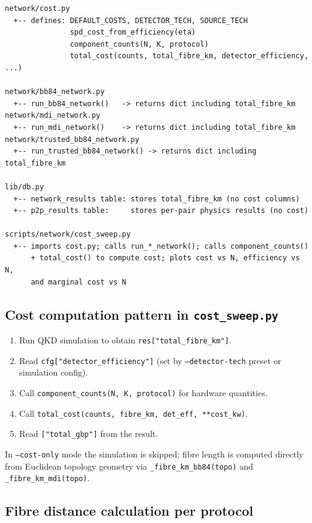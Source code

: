 \documentclass[12pt,a4paper]{article}
\begin{document}
\begin{verbatim}
network/cost.py
  +-- defines: DEFAULT_COSTS, DETECTOR_TECH, SOURCE_TECH
               spd_cost_from_efficiency(eta)
               component_counts(N, K, protocol)
               total_cost(counts, total_fibre_km, detector_efficiency, ...)

network/bb84_network.py
  +-- run_bb84_network()   -> returns dict including total_fibre_km
network/mdi_network.py
  +-- run_mdi_network()    -> returns dict including total_fibre_km
network/trusted_bb84_network.py
  +-- run_trusted_bb84_network() -> returns dict including total_fibre_km

lib/db.py
  +-- network_results table: stores total_fibre_km (no cost columns)
  +-- p2p_results table:     stores per-pair physics results (no cost)

scripts/network/cost_sweep.py
  +-- imports cost.py; calls run_*_network(); calls component_counts()
      + total_cost() to compute cost; plots cost vs N, efficiency vs N,
      and marginal cost vs N
\end{verbatim}

\subsection{Cost computation pattern in \texttt{cost\_sweep.py}}

\begin{enumerate}
  \item Run QKD simulation to obtain \texttt{res["total\_fibre\_km"]}.
  \item Read \texttt{cfg["detector\_efficiency"]} (set by \texttt{--detector-tech}
        preset or simulation config).
  \item Call \texttt{component\_counts(N, K, protocol)} for hardware quantities.
  \item Call \texttt{total\_cost(counts, fibre\_km, det\_eff, **cost\_kw)}.
  \item Read \texttt{["total\_gbp"]} from the result.
\end{enumerate}

In \texttt{--cost-only} mode the simulation is skipped; fibre length is computed
directly from Euclidean topology geometry via \texttt{\_fibre\_km\_bb84(topo)}
and \texttt{\_fibre\_km\_mdi(topo)}.

\subsection{Fibre distance calculation per protocol}
\end{document}
